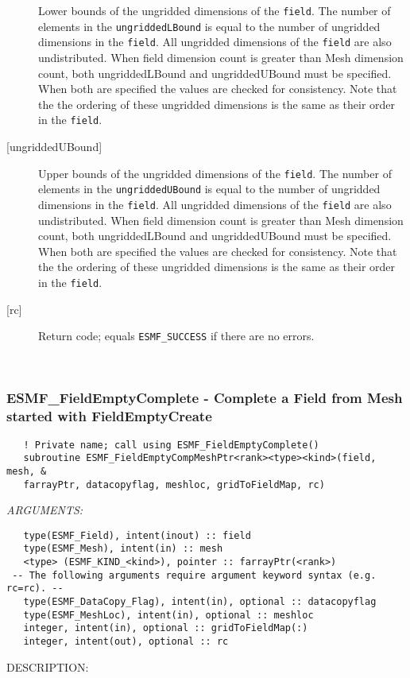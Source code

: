 \begin{description}
   Lower bounds of the ungridded dimensions of the {\tt field}. 
   The number of elements in the {\tt ungriddedLBound} is equal to the number of ungridded 
   dimensions in the {\tt field}. All ungridded dimensions of the 
   {\tt field} are also undistributed. When field dimension count is 
   greater than Mesh dimension count, both ungriddedLBound and ungriddedUBound 
   must be specified. When both are specified the values are checked 
   for consistency. Note that the the ordering of 
   these ungridded dimensions is the same as their order in the {\tt field}. 
   \item [{[ungriddedUBound]}] 
   Upper bounds of the ungridded dimensions of the {\tt field}. 
   The number of elements in the {\tt ungriddedUBound} is equal to the number of ungridded 
   dimensions in the {\tt field}. All ungridded dimensions of the 
   {\tt field} are also undistributed. When field dimension count is 
   greater than Mesh dimension count, both ungriddedLBound and ungriddedUBound 
   must be specified. When both are specified the values are checked 
   for consistency. Note that the the ordering of 
   these ungridded dimensions is the same as their order in the {\tt field}. 
   \item [{[rc]}] 
   Return code; equals {\tt ESMF\_SUCCESS} if there are no errors. 
   \end{description} 
    
 
\mbox{}\hrulefill\ 
 
\subsubsection [ESMF\_FieldEmptyComplete] {ESMF\_FieldEmptyComplete - Complete a Field from Mesh started with FieldEmptyCreate }


   
\begin{verbatim}   ! Private name; call using ESMF_FieldEmptyComplete() 
   subroutine ESMF_FieldEmptyCompMeshPtr<rank><type><kind>(field, mesh, & 
   farrayPtr, datacopyflag, meshloc, gridToFieldMap, rc) 
   \end{verbatim}{\em ARGUMENTS:}
\begin{verbatim}   type(ESMF_Field), intent(inout) :: field 
   type(ESMF_Mesh), intent(in) :: mesh 
   <type> (ESMF_KIND_<kind>), pointer :: farrayPtr(<rank>) 
 -- The following arguments require argument keyword syntax (e.g. rc=rc). --
   type(ESMF_DataCopy_Flag), intent(in), optional :: datacopyflag 
   type(ESMF_MeshLoc), intent(in), optional :: meshloc 
   integer, intent(in), optional :: gridToFieldMap(:) 
   integer, intent(out), optional :: rc 
   \end{verbatim}
{\sf DESCRIPTION:\\ }

